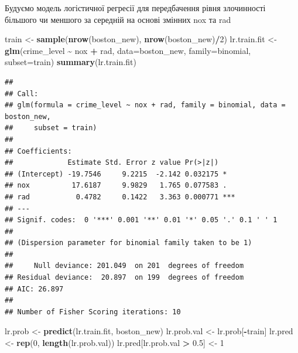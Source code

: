 \documentclass[
]{article}
\newenvironment{Shaded}{\begin{snugshade}}{\end{snugshade}}
\newcommand{\AttributeTok}[1]{\textcolor[rgb]{0.13,0.29,0.53}{#1}}
\newcommand{\DecValTok}[1]{\textcolor[rgb]{0.00,0.00,0.81}{#1}}
\newcommand{\FloatTok}[1]{\textcolor[rgb]{0.00,0.00,0.81}{#1}}
\newcommand{\FunctionTok}[1]{\textcolor[rgb]{0.13,0.29,0.53}{\textbf{#1}}}
\newcommand{\NormalTok}[1]{#1}
\newcommand{\OtherTok}[1]{\textcolor[rgb]{0.56,0.35,0.01}{#1}}
\newcommand{\SpecialCharTok}[1]{\textcolor[rgb]{0.81,0.36,0.00}{\textbf{#1}}}
\begin{document}
Будуємо модель логістичної регресії для передбачення рівня злочинності
більшого чи меншого за середній на основі змінних nox та rad

\begin{Shaded}
\begin{Highlighting}[]
\NormalTok{train }\OtherTok{\textless{}{-}} \FunctionTok{sample}\NormalTok{(}\FunctionTok{nrow}\NormalTok{(boston\_new), }\FunctionTok{nrow}\NormalTok{(boston\_new)}\SpecialCharTok{/}\DecValTok{2}\NormalTok{)}
\NormalTok{lr.train.fit }\OtherTok{\textless{}{-}} \FunctionTok{glm}\NormalTok{(crime\_level }\SpecialCharTok{\textasciitilde{}}\NormalTok{ nox }\SpecialCharTok{+}\NormalTok{ rad, }\AttributeTok{data=}\NormalTok{boston\_new, }\AttributeTok{family=}\NormalTok{binomial, }\AttributeTok{subset=}\NormalTok{train)}
\FunctionTok{summary}\NormalTok{(lr.train.fit)}
\end{Highlighting}
\end{Shaded}

\begin{verbatim}
## 
## Call:
## glm(formula = crime_level ~ nox + rad, family = binomial, data = boston_new, 
##     subset = train)
## 
## Coefficients:
##             Estimate Std. Error z value Pr(>|z|)    
## (Intercept) -19.7546     9.2215  -2.142 0.032175 *  
## nox          17.6187     9.9829   1.765 0.077583 .  
## rad           0.4782     0.1422   3.363 0.000771 ***
## ---
## Signif. codes:  0 '***' 0.001 '**' 0.01 '*' 0.05 '.' 0.1 ' ' 1
## 
## (Dispersion parameter for binomial family taken to be 1)
## 
##     Null deviance: 201.049  on 201  degrees of freedom
## Residual deviance:  20.897  on 199  degrees of freedom
## AIC: 26.897
## 
## Number of Fisher Scoring iterations: 10
\end{verbatim}

\begin{Shaded}
\begin{Highlighting}[]
\NormalTok{lr.prob }\OtherTok{\textless{}{-}} \FunctionTok{predict}\NormalTok{(lr.train.fit, boston\_new)}
\NormalTok{lr.prob.val }\OtherTok{\textless{}{-}}\NormalTok{ lr.prob[}\SpecialCharTok{{-}}\NormalTok{train]}
\NormalTok{lr.pred }\OtherTok{\textless{}{-}} \FunctionTok{rep}\NormalTok{(}\DecValTok{0}\NormalTok{, }\FunctionTok{length}\NormalTok{(lr.prob.val))}
\NormalTok{lr.pred[lr.prob.val }\SpecialCharTok{\textgreater{}} \FloatTok{0.5}\NormalTok{] }\OtherTok{\textless{}{-}} \DecValTok{1}
\end{Highlighting}
\end{Shaded}
\end{document}
